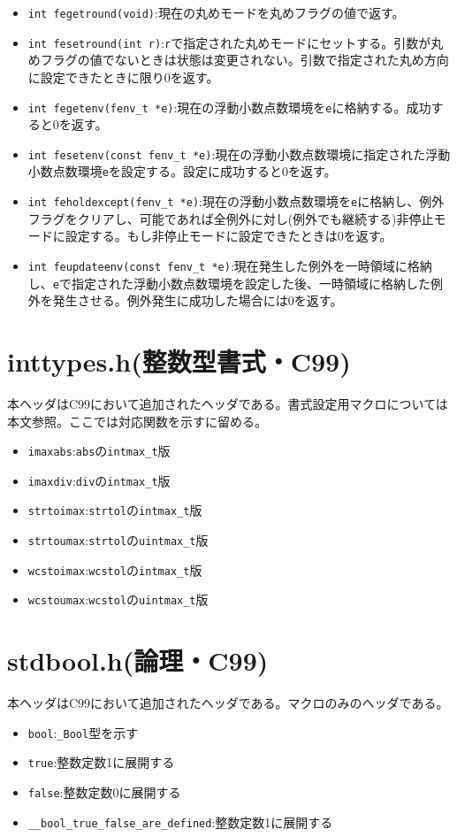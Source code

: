 \begin{itemize}
\item \verb|int fegetround(void)|:現在の丸めモードを丸めフラグの値で返す。 
\item \verb|int fesetround(int r)|:\verb|r|で指定された丸めモードにセットする。引数が丸めフラグの値でないときは状態は変更されない。引数で指定された丸め方向に設定できたときに限り0を返す。 
\item \verb|int fegetenv(fenv_t *e)|:現在の浮動小数点数環境を\verb|e|に格納する。成功すると0を返す。 
\item \verb|int fesetenv(const fenv_t *e)|:現在の浮動小数点数環境に指定された浮動小数点数環境\verb|e|を設定する。設定に成功すると0を返す。 
\item \verb|int feholdexcept(fenv_t *e)|:現在の浮動小数点数環境を\verb|e|に格納し、例外フラグをクリアし、可能であれば全例外に対し(例外でも継続する)非停止モードに設定する。もし非停止モードに設定できたときは0を返す。 
\item \verb|int feupdateenv(const fenv_t *e)|:現在発生した例外を一時領域に格納し、\verb|e|で指定された浮動小数点数環境を設定した後、一時領域に格納した例外を発生させる。例外発生に成功した場合には0を返す。 
\end{itemize}

\section{inttypes.h(整数型書式・C99)}
本ヘッダはC99において追加されたヘッダである。書式設定用マクロについては本文参照。ここでは対応関数を示すに留める。
\begin{multicols}{2}
\begin{itemize}
\item \verb|imaxabs|:\verb|abs|の\verb|intmax_t|版
\item \verb|imaxdiv|:\verb|div|の\verb|intmax_t|版
\item \verb|strtoimax|:\verb|strtol|の\verb|intmax_t|版
\item \verb|strtoumax|:\verb|strtol|の\verb|uintmax_t|版
\item \verb|wcstoimax|:\verb|wcstol|の\verb|intmax_t|版
\item \verb|wcstoumax|:\verb|wcstol|の\verb|uintmax_t|版
\end{itemize}
\end{multicols}

\section{stdbool.h(論理・C99)}
本ヘッダはC99において追加されたヘッダである。マクロのみのヘッダである。
\begin{itemize}
\item \verb|bool|:\verb|_Bool|型を示す
\item \verb|true|:整数定数1に展開する
\item \verb|false|:整数定数0に展開する
\item \verb|__bool_true_false_are_defined|:整数定数1に展開する
\end{itemize}

